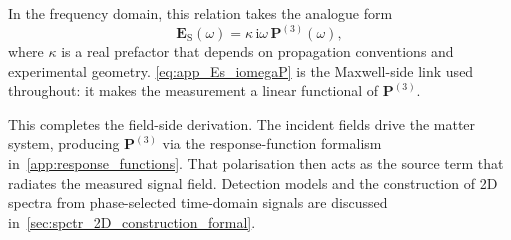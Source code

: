 In the frequency domain, this relation takes the analogue form
\begin{equation}
	\boldsymbol{E}_{\mathrm{S}}(\omega) = \kappa\, \mathrm{i}\omega\,\boldsymbol{P}^{(3)}(\omega),
	\label{eq:app_Es_iomegaP}
\end{equation}
where $\kappa$ is a real prefactor that depends on propagation conventions and experimental geometry. \autoref{eq:app_Es_iomegaP} is the Maxwell-side link used throughout: it makes the measurement a linear functional of $\boldsymbol{P}^{(3)}$.

\medskip

This completes the field-side derivation. The incident fields drive the matter system, producing $\boldsymbol{P}^{(3)}$ via the response-function formalism in~\autoref{app:response_functions}. That polarisation then acts as the source term that radiates the measured signal field. Detection models and the construction of 2D spectra from phase-selected time-domain signals are discussed in~\autoref{sec:spctr_2D_construction_formal}.
